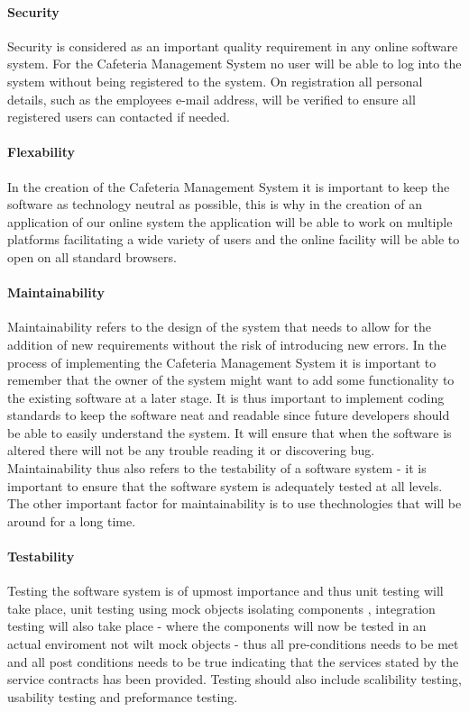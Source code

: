 \documentclass[12pt]{article}
\begin{document}
\paragraph{Security\\}
Security is considered as an important quality requirement in any online software system. For the Cafeteria Management System no user will be able to log into the system without being registered to the system. On registration all personal details, such as the employees e-mail address, will be verified to ensure all registered users can contacted if needed. 

\paragraph{Flexability\\}
In the creation of the Cafeteria Management System it is important to keep the software as technology neutral as possible, this is why in the creation of an application of our online system the application will be able to work on multiple platforms facilitating a wide variety of users and the online facility will be able to open on all standard browsers. 

\paragraph{Maintainability\\}
Maintainability refers to the design of the system that needs to allow for the addition of new requirements without the risk of introducing new errors. In the process of implementing the Cafeteria Management System it is important to remember that the owner of the system might  want to add some functionality to the existing software at a later stage. It is thus important to implement coding standards to keep the software neat and readable since future developers should be able to easily understand the system. It will ensure that when the software is altered there will not be any trouble reading it or discovering bug. Maintainability thus also refers to the testability of a software system - it is important to ensure that the software system is adequately tested at all levels.\\
The other important factor for maintainability is to use thechnologies that will be around for a long time. 

\paragraph{Testability\\}
Testing the software system is of upmost importance and thus unit testing will take place, unit testing using mock objects isolating components , integration testing will also take place - where the components will now be tested in an actual enviroment not wilt mock objects - thus all pre-conditions needs to be met and all post conditions needs to be true indicating that the services stated by the service contracts has been provided. Testing should also include scalibility testing, usability testing and preformance testing. 
\end{document}
